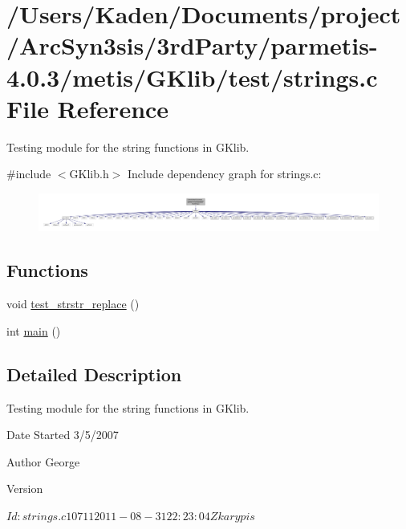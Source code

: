 \hypertarget{a00155}{}\section{/\+Users/\+Kaden/\+Documents/project/\+Arc\+Syn3sis/3rd\+Party/parmetis-\/4.0.3/metis/\+G\+Klib/test/strings.c File Reference}
\label{a00155}


Testing module for the string functions in G\+Klib.  


{\ttfamily \#include $<$G\+Klib.\+h$>$}\newline
Include dependency graph for strings.\+c\+:\nopagebreak
\begin{figure}[H]
\begin{center}
\leavevmode
\includegraphics[width=350pt]{a00156}
\end{center}
\end{figure}
\subsection*{Functions}
\begin{DoxyCompactItemize}
\item 
void \hyperlink{a00155_a3666be16b4df33d86374ee780353af54}{test\+\_\+strstr\+\_\+replace} ()
\item 
int \hyperlink{a00155_ae66f6b31b5ad750f1fe042a706a4e3d4}{main} ()
\end{DoxyCompactItemize}


\subsection{Detailed Description}
Testing module for the string functions in G\+Klib. 

\begin{DoxyDate}{Date}
Started 3/5/2007 
\end{DoxyDate}
\begin{DoxyAuthor}{Author}
George 
\end{DoxyAuthor}
\begin{DoxyVersion}{Version}
\begin{DoxyVerb}$Id: strings.c 10711 2011-08-31 22:23:04Z karypis $ \end{DoxyVerb}
 
\end{DoxyVersion}


